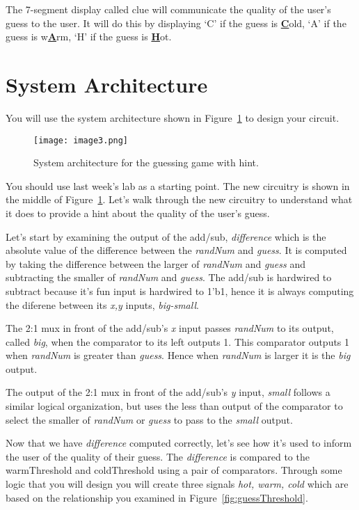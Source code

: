The 7-segment display called clue will communicate the quality of the
user's guess to the user. It will do this by displaying `C' if the guess
is \textbf{\uline{C}}old, `A' if the guess is w\textbf{\uline{A}}rm, `H'
if the guess is \textbf{\uline{H}}ot.

\section{System Architecture}
You will use the system
architecture shown in Figure~\ref{fig:guessWithHintSystemArch} to
design your circuit.

\begin{figure}[ht]
    \texttt{[image:  image3.png]}
    \caption{System architecture for the guessing game with hint. }
    \label{fig:guessWithHintSystemArch}
\end{figure}

You should use last week's lab as a starting point. The new circuitry is shown in the middle of
Figure~\ref{fig:guessWithHintSystemArch}.  Let's walk through the new circuitry
to understand what it does to provide a hint about the quality of the user's guess.

Let's start by examining the output of the add/sub, \emph{difference} which is the absolute
value of the difference between the \emph{randNum} and \emph{guess}.  It is computed
by taking the difference between the larger of \emph{randNum} and \emph{guess} and
subtracting the smaller of \emph{randNum} and \emph{guess}.  The add/sub is hardwired
to subtract because it's fun input is hardwired to 1'b1, hence it is always computing the
diferene between its \emph{x,y} inputs, \emph{big-small}.

The 2:1 mux in front of the add/sub's \emph{x} input passes \emph{randNum} to its
output, called \emph{big}, when the comparator to its left outputs 1.  This comparator
outputs 1 when \emph{randNum} is greater than \emph{guess}.  Hence when \emph{randNum}
is larger it is the \emph{big} output.

The output of the 2:1 mux in front of the add/sub's \emph{y} input, \emph{small} follows
a similar logical organization, but uses the less than output of the comparator to select the
smaller of \emph{randNum} or \emph{guess} to pass to the \emph{small} output.

Now that we have \emph{difference} computed correctly, let's see how it's used
to inform the user of the quality of their guess. The
\emph{difference} is compared to the warmThreshold and coldThreshold
using a pair of comparators. Through some logic that you will design you
will create three signals \emph{hot, warm, cold} which are based on the
relationship you examined in Figure~\ref{fig:guessThreshold}.


